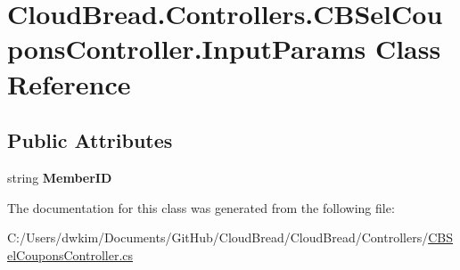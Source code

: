 \hypertarget{a00120}{}\section{Cloud\+Bread.\+Controllers.\+C\+B\+Sel\+Coupons\+Controller.\+Input\+Params Class Reference}
\label{a00120}
\subsection*{Public Attributes}
\begin{DoxyCompactItemize}
\item 
string {\bfseries Member\+ID}\hypertarget{a00120_a6c7de5af57832a0355d7a5401e05e886}{}\label{a00120_a6c7de5af57832a0355d7a5401e05e886}

\end{DoxyCompactItemize}


The documentation for this class was generated from the following file\+:\begin{DoxyCompactItemize}
\item 
C\+:/\+Users/dwkim/\+Documents/\+Git\+Hub/\+Cloud\+Bread/\+Cloud\+Bread/\+Controllers/\hyperlink{a00216}{C\+B\+Sel\+Coupons\+Controller.\+cs}\end{DoxyCompactItemize}
